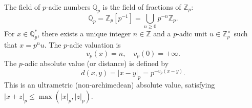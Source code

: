 The field of $p$-adic numbers $\mathbb{Q}_p$ is the field of fractions of $\mathbb{Z}_p$:
$$\mathbb{Q}_p = \mathbb{Z}_p[p^{-1}] = \bigcup_{n \geq 0} p^{-n}\mathbb{Z}_p.$$
For $x \in \mathbb{Q}_p^*$, there exists a unique integer $n \in \mathbb{Z}$ and a $p$-adic unit $u \in \mathbb{Z}_p^\times$ such that $x = p^n u$. The $p$-adic valuation is
$$v_p(x) = n, \quad v_p(0) = +\infty.$$
The $p$-adic absolute value (or distance) is defined by
$$d(x, y) = |x-y|_p = p^{-v_p(x-y)}.$$
This is an ultrametric (non-archimedean) absolute value, satisfying $|x+z|_p \leq \max(|x|_p, |z|_p)$.

